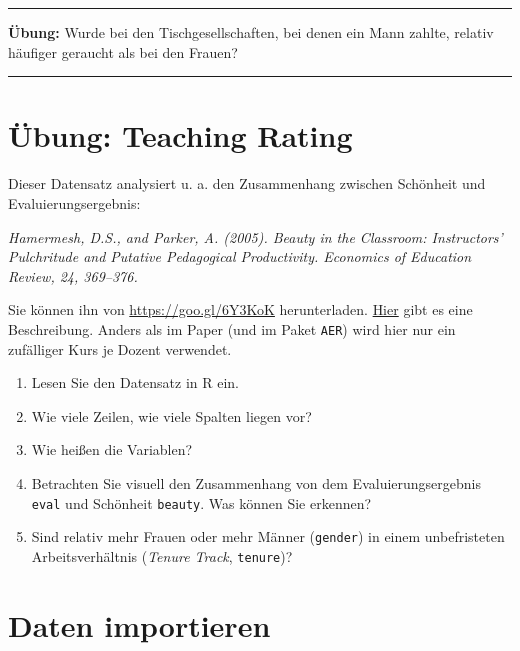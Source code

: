 \documentclass[12pt,ngerman,paper=a4,pagesize,DIV=13]{scrreprt}
\providecommand{\tightlist}{%
  \setlength{\itemsep}{0pt}\setlength{\parskip}{0pt}}
\begin{document}
\begin{center}\rule{0.5\linewidth}{\linethickness}\end{center}

\textbf{Übung:} Wurde bei den Tischgesellschaften, bei denen ein Mann
zahlte, relativ häufiger geraucht als bei den Frauen?

\begin{center}\rule{0.5\linewidth}{\linethickness}\end{center}

\hypertarget{ubung-teaching-rating}{%
\section{Übung: Teaching Rating}\label{ubung-teaching-rating}}

Dieser Datensatz analysiert u. a. den Zusammenhang zwischen Schönheit
und Evaluierungsergebnis:

\emph{Hamermesh, D.S., and Parker, A. (2005). Beauty in the Classroom:
Instructors' Pulchritude and Putative Pedagogical Productivity.
Economics of Education Review, 24, 369--376.}

Sie können ihn von \url{https://goo.gl/6Y3KoK} herunterladen.
\href{https://github.com/luebby/Datenanalyse-mit-R/blob/master/Daten/TeachingRatings-help.pdf}{Hier}
gibt es eine Beschreibung. Anders als im Paper (und im Paket
\texttt{AER}) wird hier nur ein zufälliger Kurs je Dozent verwendet.

\begin{enumerate}
\def\labelenumi{\arabic{enumi}.}
\tightlist
\item
  Lesen Sie den Datensatz in R ein.
\item
  Wie viele Zeilen, wie viele Spalten liegen vor?
\item
  Wie heißen die Variablen?
\item
  Betrachten Sie visuell den Zusammenhang von dem Evaluierungsergebnis
  \texttt{eval} und Schönheit \texttt{beauty}. Was können Sie erkennen?
\item
  Sind relativ mehr Frauen oder mehr Männer (\texttt{gender}) in einem
  unbefristeten Arbeitsverhältnis (\emph{Tenure Track},
  \texttt{tenure})?
\end{enumerate}

\hypertarget{daten-importieren}{%
\section{Daten importieren}\label{daten-importieren}}
\end{document}
